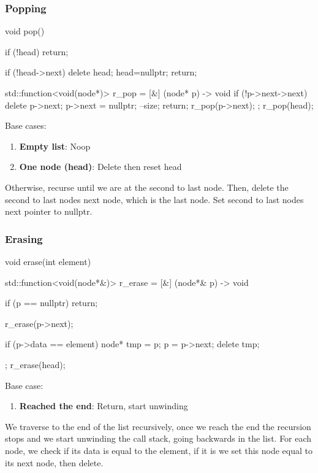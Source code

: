 \documentclass{report}
\begin{document}
\subsubsection{Popping}
\bigbreak \noindent 
\begin{cppcode}
    void pop() {
        if (!head) return;

        if (!head->next) {
            delete head;
            head=nullptr;
            return;
        }

        std::function<void(node*)> r_pop = [&] (node* p) -> void {
            if (!p->next->next) {
                delete p->next;
                p->next = nullptr;
                --size;
                return;
            }
            r_pop(p->next);
        };
        r_pop(head);
    }
\end{cppcode}
\bigbreak \noindent 
Base cases:
\begin{enumerate}
    \item \textbf{Empty list}: Noop
    \item \textbf{One node (head)}: Delete then reset head
\end{enumerate}
Otherwise, recurse until we are at the second to last node. Then, delete the second to last nodes next node, which is the last node. Set second to last nodes next pointer to nullptr.

\pagebreak 
\subsubsection{Erasing}
\bigbreak \noindent 
\begin{cppcode}
    void erase(int element) {
        std::function<void(node*&)> r_erase = [&] (node*& p) -> void {
            if (p == nullptr) {
                return;
            }

            r_erase(p->next);

            if (p->data == element) {
                node* tmp = p;
                p = p->next;
                delete tmp;
            }
        };
        r_erase(head);
    }
\end{cppcode}
\bigbreak \noindent 
Base case:
\begin{enumerate}
    \item \textbf{Reached the end}: Return, start unwinding
\end{enumerate}
\bigbreak \noindent 
We traverse to the end of the list recursively, once we reach the end the recursion stops and we start unwinding the call stack, going backwards in the list.
\bigbreak \noindent 
For each node, we check if its data is equal to the element, if it is we set this node equal to its next node, then delete.
\end{document}
